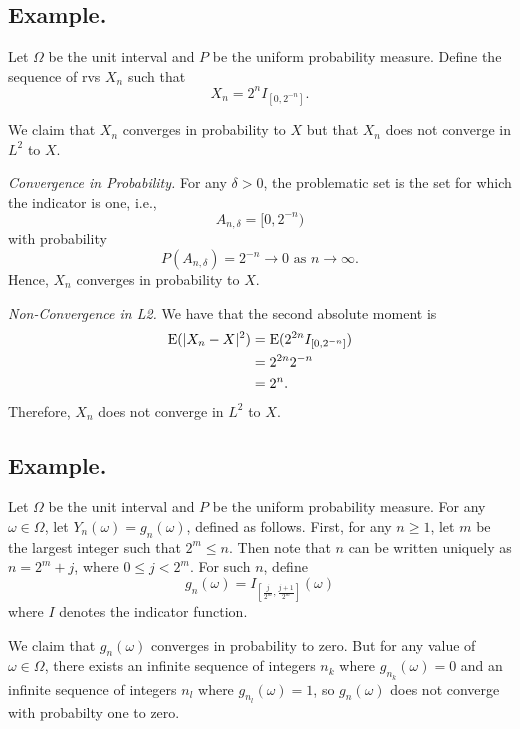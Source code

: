 \documentclass[titlepage]{article}
\begin{document}
\subsection{Example.} Let $\Omega$ be the unit interval and $P$ be the uniform probability measure. Define the sequence of rvs $X_{n}$ such that 
$$X_{n} = 2^{n}I_{[0, 2^{-n}]}.$$

We claim that $X_{n}$ converges in probability to $X$ but that $X_{n}$ does not converge in $L^{2}$ to $X$.

\textit{Convergence in Probability.} For any $\delta > 0$, the problematic set is the set for which the indicator is one, i.e., 
$$A_{n,\delta} = [0, 2^{-n})$$
with probability
$$P(A_{n,\delta}) = 2^{-n} \to 0 \text{ as } n \to \infty.$$
Hence, $X_{n}$ converges in probability to $X$.

\textit{Non-Convergence in L2.} We have that the second absolute moment is 
\begin{align*}
    \text{E}(|X_{n} - X|^{2}) &= \text{E}(2^{2n}I_{[0, 2^{-n}]}) \\
                        &= 2^{2n}2^{-n} \\
                        &= 2^{n}.
\end{align*}
Therefore, $X_{n}$ does not converge in $L^{2}$ to $X$.

\subsection{Example.} Let $\Omega$ be the unit interval and $P$ be the uniform probability measure. For any $\omega \in \Omega$, let $Y_n(\omega) = g_n(\omega)$, defined as follows. First, for any $n \geq 1$, let $m$ be the largest integer such that $2^m \leq n$. Then note that $n$ can be written uniquely as $n = 2^m + j$, where $0 \leq j < 2^m$. For such $n$, define
$$g_n(\omega) = I_{\left[\frac{j}{2^m}, \frac{j+1}{2^m}\right]}(\omega)$$
where $I$ denotes the indicator function.

We claim that $g_n(\omega)$ converges in probability to zero. But for any value of $\omega \in \Omega$, there exists an infinite sequence of integers $n_k$ where $g_{n_k}(\omega) = 0$ and an infinite sequence of integers $n_l$ where $g_{n_l}(\omega) = 1$, so $g_n(\omega)$ does not converge with probabilty one to zero.
\end{document}
